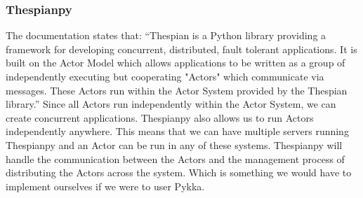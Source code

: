 \documentclass[a4paper]{article}
\begin{document}
\subsubsection{Thespianpy}
The documentation states that: \enquote{Thespian is a Python library providing a framework for developing concurrent, distributed, fault tolerant applications. It is built on the Actor Model which allows applications to be written as a group of independently executing but cooperating "Actors" which communicate via messages. These Actors run within the Actor System provided by the Thespian library.} Since all Actors run independently within the Actor System, we can create concurrent applications. Thespianpy also allows us to run Actors independently anywhere. This means that we can have multiple servers running Thespianpy and an Actor can be run in any of these systems. Thespianpy will handle the communication between the Actors and the management process of distributing the Actors across the system. Which is something we would have to implement ourselves if we were to user Pykka.
\printbibliography
\end{document}
